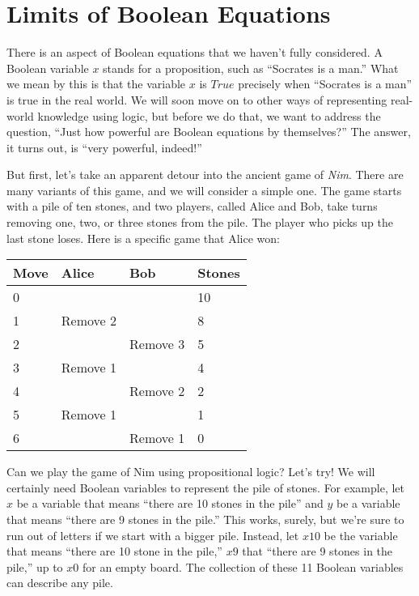 \section{Limits of Boolean Equations}

There is an aspect of Boolean equations that we haven't fully considered. A Boolean variable $x$ stands for a proposition, 
such as ``Socrates is a man.'' What we mean by this is that the variable $x$ is $True$ precisely when ``Socrates is a man'' 
is true in the real world. We will soon move on to other ways of representing real-world knowledge using logic, but before 
we do that, we want to address the question, ``Just how powerful are Boolean equations by themselves?'' The answer, it 
turns out, is ``very powerful, indeed!''

But first, let's take an apparent detour into the ancient game of \emph{Nim}. There are many variants of this game, and we 
will consider a simple one. The game starts with a pile of ten stones, and two players, called Alice and Bob, take turns 
removing one, two, or three stones from the pile. The player who picks up the last stone loses. Here is a specific game 
that Alice won:

\begin{flushleft}
\begin{tabular}{l|l|l|l}
Move & Alice     & Bob      & Stones \\
\hline
0    &           &          & 10     \\
1    & Remove 2  &          & 8      \\
2    &           & Remove 3 & 5      \\
3    & Remove 1  &          & 4      \\
4    &           & Remove 2 & 2      \\
5    & Remove 1  &          & 1      \\
6    &           & Remove 1 & 0      \\
\end{tabular}
\end{flushleft}

Can we play the game of Nim using propositional logic? Let's try! We will certainly need Boolean variables to represent the 
pile of stones. For example, let $x$ be a variable that means ``there are 10 stones in the pile'' and $y$ be a variable that 
means ``there are 9 stones in the pile.'' This works, surely, but we're sure to run out of letters if we start with a bigger
pile. Instead, let $x10$ be the variable that means ``there are 10 stone in the pile,'' $x9$ that ``there are 9 stones in 
the pile,'' up to $x0$ for an empty board. The collection of these 11 Boolean variables can describe any pile.

